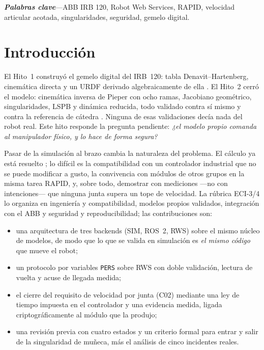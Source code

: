 \documentclass[conference]{IEEEtran}
\begin{document}
\vspace{0.4em}
\noindent\textbf{\textit{Palabras clave}}---ABB IRB 120, Robot Web
Services, RAPID, velocidad articular acotada, singularidades, seguridad,
gemelo digital.

\section{Introducción}

El Hito~1 construyó el gemelo digital del IRB~120: tabla
Denavit--Hartenberg, cinemática directa y un URDF derivado
algebraicamente de ella \cite{b7}. El Hito~2 cerró el modelo: cinemática
inversa de Pieper con ocho ramas, Jacobiano geométrico, singularidades,
LSPB y dinámica reducida, todo validado contra sí mismo y contra la
referencia de cátedra \cite{b8}. Ninguna de esas validaciones decía nada
del robot real. Este hito responde la pregunta pendiente: \emph{¿el
modelo propio comanda al manipulador físico, y lo hace de forma
segura?}

Pasar de la simulación al brazo cambia la naturaleza del problema. El
cálculo ya está resuelto \cite{b1,b2}; lo difícil es la compatibilidad
con un controlador industrial que no se puede modificar a gusto, la
convivencia con módulos de otros grupos en la misma tarea RAPID, y,
sobre todo, demostrar con mediciones ---no con intenciones--- que
ninguna junta supera un tope de velocidad. La rúbrica ECI-3/4 \cite{b11}
lo organiza en ingeniería y compatibilidad, modelos propios validados,
integración con el ABB y seguridad y reproducibilidad; las
contribuciones son:
\begin{itemize}
\item una arquitectura de tres backends (SIM, ROS~2, RWS) sobre el mismo
núcleo de modelos, de modo que lo que se valida en simulación es
\emph{el mismo código} que mueve el robot;
\item un protocolo por variables \texttt{PERS} sobre RWS con doble
validación, lectura de vuelta y acuse de llegada medida;
\item el cierre del requisito de velocidad por junta (C02) mediante una
ley de tiempo impuesta en el controlador y una evidencia medida, ligada
criptográficamente al módulo que la produjo;
\item una revisión previa con cuatro estados y un criterio formal para
entrar y salir de la singularidad de muñeca, más el análisis de cinco
incidentes reales.
\end{itemize}
\end{document}
